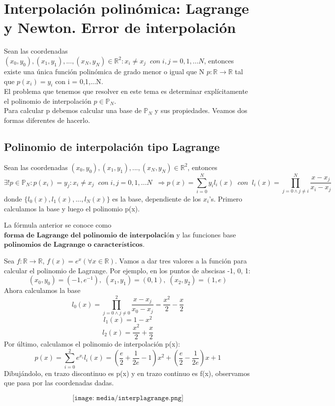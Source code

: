 \section{Interpolación polinómica: Lagrange y Newton. Error de interpolación}
Sean las coordenadas $(x_0,y_0), (x_1,y_1),...,(x_N,y_N) \in \mathbb{R}^2 : x_i \neq x_j \; \; con \; i,j = 0,1,...N$, entonces existe una única función polinómica de grado menor o igual que N $p : \mathbb{R} \longrightarrow \mathbb{R}$ tal que $p(x_i) = y_i$ con i = 0,1,...N.\\
El problema que tenemos que resolver en este tema es determinar explícitamente el polinomio de interpolación $p \in \mathbb{P} _N$.\\
Para calcular p debemos calcular una base de $\mathbb{P} _N$ y sus propiedades. Veamos dos formas diferentes de hacerlo.

\subsection{Polinomio de interpolación tipo Lagrange}
\begin{nth}
Sean las coordenadas $(x_0,y_0), (x_1,y_1),...,(x_N,y_N) \in \mathbb{R}^2$, entonces
\[ \exists ! p \in \mathbb{P} _N : p(x_i) = y_j : x_i \neq x_j \; \; con \; i,j = 0,1,...N \; \; \Rightarrow p(x) = \sum_{i=0}^N y_il_i(x) \; \; con \; \; l_i(x) = \prod_{j=0 \wedge j \neq i}^N \frac{x-x_j}{x_i-x_j} \]
donde $\lbrace l_0(x), l_1(x),...,l_N(x) \rbrace$ es la base, dependiente de los $x_i$'s. Primero calculamos la base y luego el polinomio p(x).
\end{nth}

La fórmula anterior se conoce como $\textbf{forma de Lagrange del polinomio de
interpolación}$ y las funciones base $\textbf{polinomios de Lagrange o característicos}$.

\begin{ejemplo}
Sea $f: \mathbb{R} \longrightarrow \mathbb{R}$, $f(x) = e^x ( \forall x \in \mathbb{R} )$. Vamos a dar tres valores a la función para calcular el polinomio de Lagrange. Por ejemplo, en los puntos de abscisas -1, 0, 1:
\[ (x_0, y_0) = (-1,e^{-1}), \; (x_1,y_1) = (0,1), \; (x_2,y_2) = (1,e) \]
Ahora calculamos la base
\[ l_0(x) = \prod_{j=0 \wedge j \neq 0}^2 \frac{x-x_j}{x_0-x_j} = \frac{x^2}{2} - \frac{x}{2} \]
\[ l_1(x) = 1 - x^2 \]
\[ l_2(x) = \frac{x^2}{2} + \frac{x}{2} \]
Por último, calculamos el polinomio  de interpolación p(x):
\[ p(x) = \sum _{i=0}^2 e^{x_i}l_i(x) = \left( \frac{e}{2} + \frac{1}{2e} - 1 \right) x^2 + \left( \frac{e}{2} - \frac{1}{2e} \right) x + 1 \]
Dibujándolo, en trazo discontinuo es p(x) y en trazo continuo es f(x), observamos que pasa por las coordenadas dadas.

\[ \texttt{[image: media/interplagrange.png]} \]
\end{ejemplo}

